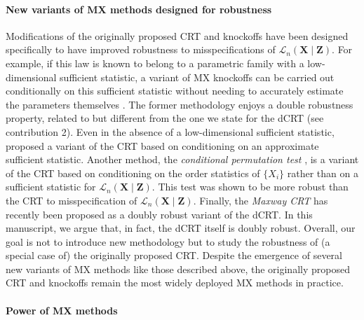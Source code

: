 \documentclass[aos]{imsart}
\theoremstyle{plain}
\theoremstyle{remark}
\newcommand{\prx}{\bm X}								%
\newcommand{\srx}{X}									%
\newcommand{\prz}{\bm Z}								%
\newcommand{\law}{\mathcal L}							%
\begin{document}
\paragraph*{New variants of MX methods designed for robustness}

Modifications of the originally proposed CRT and knockoffs have been designed specifically to have improved robustness to misspecifications of $\law_n(\prx \mid \prz)$. For example, if this law is known to belong to a parametric family with a low-dimensional sufficient statistic, a variant of MX knockoffs can be carried out conditionally on this sufficient statistic without needing to accurately estimate the parameters themselves \citep{Huang2019}. The former methodology enjoys a double robustness property, related to but different from the one we state for the dCRT (see contribution 2). Even in the absence of a low-dimensional sufficient statistic, \citet{Barber2020} proposed a variant of the CRT based on conditioning on an approximate sufficient statistic. Another method, the \textit{conditional permutation test} \citep{Berrett2019}, is a variant of the CRT based on conditioning on the order statistics of $\{\srx_i\}$ rather than on a sufficient statistic for $\law_n(\prx \mid \prz)$. This test was shown to be more robust than the CRT to misspecification of $\law_n(\prx \mid \prz)$. Finally, the \textit{Maxway CRT} \citep{Li2022} has recently been proposed as a doubly robust variant of the dCRT. In this manuscript, we argue that, in fact, the dCRT itself is doubly robust. %
Overall, our goal is not to introduce new methodology but to study the robustness of (a special case of) the originally proposed CRT. Despite the emergence of several new variants of MX methods like those described above, the originally proposed CRT and knockoffs remain the most widely deployed MX methods in practice.


\paragraph*{Power of MX methods}
\end{document}
